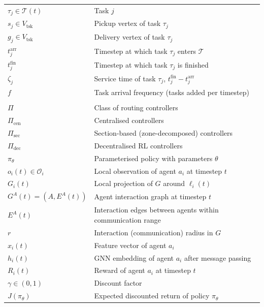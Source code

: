 \begin{table}[htbp]
\begin{tabular}{@{}ll@{}}
\( \tau_j \in \mathcal{T}(t) \) & Task \( j \) \\
\( s_j \in V_{\mathrm{tsk}} \)  & Pickup vertex of task \( \tau_j \) \\
\( g_j \in V_{\mathrm{tsk}} \)  & Delivery vertex of task \( \tau_j \) \\
\( t^{\mathrm{arr}}_j \)    & Timestep at which task \( \tau_j \) enters \( \mathcal{T} \) \\
\( t^{\mathrm{fin}}_j \)    & Timestep at which task \( \tau_j \) is finished \\
\( \zeta_j \)               & Service time of task \( \tau_j \), \( t^{\mathrm{fin}}_j - t^{\mathrm{arr}}_j \) \\
\( f \)                     & Task arrival frequency (tasks added per timestep) \\
\addlinespace
\multicolumn{2}{@{}l}{\textit{Controllers and RL}}\\
\( \Pi \)                   & Class of routing controllers \\
\( \Pi_{\mathrm{cen}} \)    & Centralised controllers \\
\( \Pi_{\mathrm{sec}} \)    & Section-based (zone-decomposed) controllers \\
\( \Pi_{\mathrm{dec}} \)    & Decentralised RL controllers \\
\( \pi_\theta \)            & Parameterised policy with parameters \( \theta \) \\
\( o_i(t) \in \mathcal{O}_i \) & Local observation of agent \( a_i \) at timestep \( t \) \\
\( G_i(t) \)                & Local projection of \( G \) around \( \ell_i(t) \) \\
\( G^{A}(t) = (A, E^{A}(t)) \) & Agent interaction graph at timestep \( t \) \\
\( E^{A}(t) \)              & Interaction edges between agents within communication range \\
\( r \)                     & Interaction (communication) radius in \( G \) \\
\( x_i(t) \)                & Feature vector of agent \( a_i \) \\
\( h_i(t) \)                & GNN embedding of agent \( a_i \) after message passing \\
\( R_i(t) \)                & Reward of agent \( a_i \) at timestep \( t \) \\
\( \gamma \in (0,1) \)      & Discount factor \\
\( J(\pi_\theta) \)         & Expected discounted return of policy \( \pi_\theta \) \\

\end{tabular}
\end{table}
